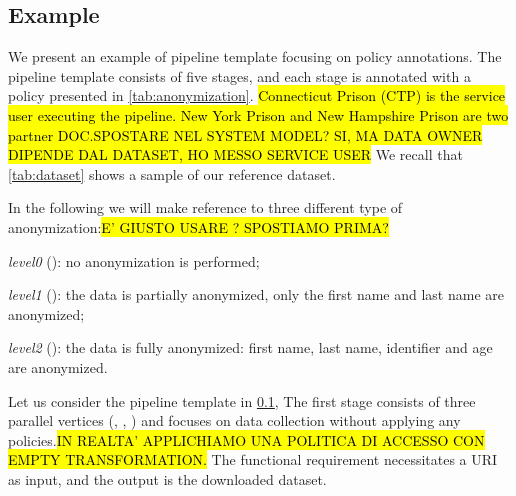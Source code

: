 \subsection{Example}\label{sec:example}
\newcommand{\pone}{$\langle service,owner=dataset.owner\rangle$}
\newcommand{\ptwo}{$\langle service,owner=partner(dataset.owner) \rangle$}
\newcommand{\pthree}{$\langle service, owner \neq dataset.owner AND owner \neq partner(dataset.owner)$}


We present an example of pipeline template focusing on policy annotations. The pipeline template consists of five stages, and each stage is annotated with a policy presented in \cref{tab:anonymization}. \hl{Connecticut Prison (CTP) is the service user executing the pipeline. New York Prison and New Hampshire Prison are two partner DOC.}\hl{SPOSTARE NEL SYSTEM MODEL? SI, MA DATA OWNER DIPENDE DAL DATASET, HO MESSO SERVICE USER} We recall that \cref{tab:dataset} shows a sample of our reference dataset.

In the following we will make reference to three different type of anonymization:\hl{E' GIUSTO USARE ? SPOSTIAMO PRIMA?}
\begin{enumerate*}[label=\roman*)]
  \item \emph{level0} (): no anonymization is performed;
  \item \emph{level1} (): the data is partially anonymized, only the first name and last name are anonymized;
  \item \emph{level2} (): the data is fully anonymized: first name, last name, identifier and age are anonymized.
\end{enumerate*}

Let us consider the pipeline template \tChartFunction in \cref{sec:example},
The first stage consists of three parallel vertices (, , ) and focuses on data collection without applying any policies.\hl{IN REALTA' APPLICHIAMO UNA POLITICA DI ACCESSO CON EMPTY TRANSFORMATION.} The functional requirement necessitates a URI as input, and the output is the downloaded dataset.

